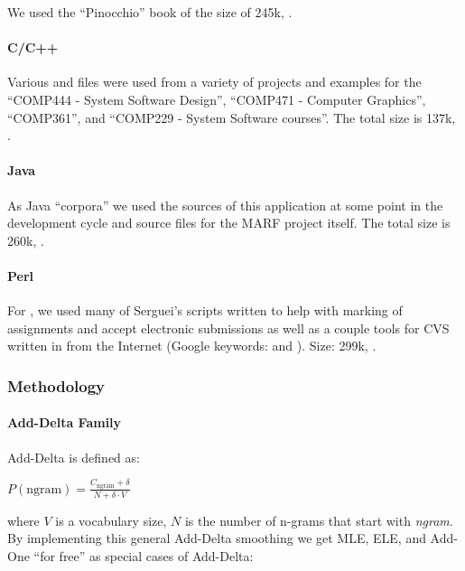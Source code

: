 We used the ``Pinocchio'' book \cite{pinocchio} of the size of 245k, .

\paragraph*{C/C++}

Various  and  files were used from a variety of projects
and examples for the ``COMP444 - System Software Design'', ``COMP471 - Computer Graphics'',
``COMP361'', and ``COMP229 - System Software courses''. The total size is 137k, .

\paragraph*{Java}

As Java ``corpora'' we used the sources of this application at some point in the
development cycle and source files for the MARF project itself.
The total size is 260k, .

\paragraph*{Perl}

For {\perl}, we used many of Serguei's scripts written to help with marking of
assignments and accept electronic submissions as well as a couple tools
for CVS written in {\perl} from the Internet (Google keywords:  and ).
Size: 299k, .


\subsubsection{Methodology}

\paragraph{Add-Delta Family}

Add-Delta is defined as:

$P(\mbox{ngram}) = \frac{C_{\mbox{ngram}} + \delta}{N + \delta \cdot V}$

\noindent
where $V$ is a vocabulary size, $N$ is the number of n-grams that start with {\em ngram}.
By implementing this general Add-Delta smoothing we get MLE, ELE, and Add-One ``for free''
as special cases of Add-Delta:

